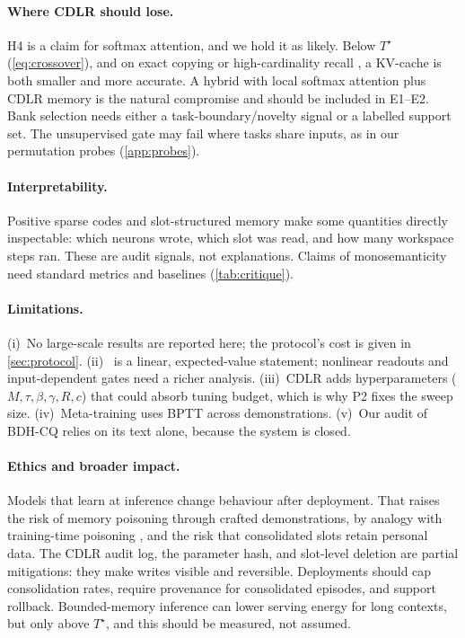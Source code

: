 \documentclass[11pt]{article}
\theoremstyle{remark}
\newcommand{\cdlr}{\textsc{CDLR}}
\begin{document}
\paragraph{Where \cdlr{} should lose.} H4 is a claim for softmax attention, and we hold it as likely. Below
$T^\star$ (\cref{eq:crossover}), and on exact copying or high-cardinality recall
\citep{arora2023zoology,jelassi2024repeat}, a KV-cache is both smaller and more accurate. A hybrid with local
softmax attention plus \cdlr{} memory is the natural compromise and should be included in E1--E2. Bank selection
needs either a task-boundary/novelty signal or a labelled support set. The unsupervised gate may fail where tasks
share inputs, as in our permutation probes (\cref{app:probes}).

\paragraph{Interpretability.} Positive sparse codes and slot-structured memory make some quantities directly
inspectable: which neurons wrote, which slot was read, and how many workspace steps ran. These are audit signals,
not explanations. Claims of monosemanticity need standard metrics and baselines (\cref{tab:critique}).

\paragraph{Limitations.} (i)~No large-scale results are reported here; the protocol's cost is given in
\cref{sec:protocol}. (ii)~ is a linear, expected-value statement; nonlinear readouts and
input-dependent gates need a richer analysis. (iii)~\cdlr{} adds hyperparameters ($M,\tau,\beta,\gamma,R,c$) that
could absorb tuning budget, which is why P2 fixes the sweep size. (iv)~Meta-training uses BPTT across
demonstrations. (v)~Our audit of BDH-CQ relies on its text alone, because the system is closed.

\paragraph{Ethics and broader impact.}
\label{sec:ethics}
Models that learn at inference change behaviour after deployment. That raises the risk of memory poisoning through
crafted demonstrations, by analogy with training-time poisoning \citep{wallace2021poisoning}, and the risk that
consolidated slots retain personal data. The \cdlr{} audit log, the parameter hash, and slot-level deletion are
partial mitigations: they make writes visible and reversible. Deployments should cap consolidation rates, require
provenance for consolidated episodes, and support rollback. Bounded-memory inference can lower serving energy for
long contexts, but only above $T^\star$, and this should be measured, not assumed.
\end{document}
